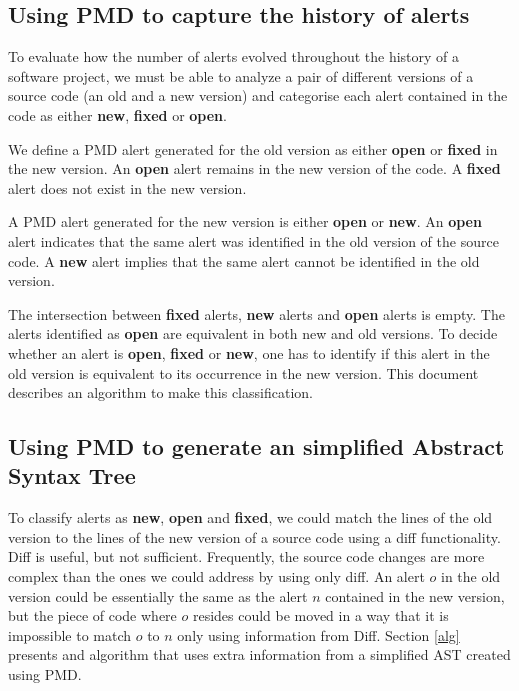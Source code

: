 \documentclass[
]{article}
\begin{document}
\normalsize

\subsection{Using PMD to capture the history of alerts}\label{history}

To evaluate how the number of alerts evolved throughout the history of a
software project, we must be able to analyze a pair of different
versions of a source code (an old and a new version) and categorise each
alert contained in the code as either \textbf{new}, \textbf{fixed} or
\textbf{open}.

We define a PMD alert generated for the old version as either
\textbf{open} or \textbf{fixed} in the new version. An \textbf{open}
alert remains in the new version of the code. A \textbf{fixed} alert
does not exist in the new version.

A PMD alert generated for the new version is either \textbf{open} or
\textbf{new}. An \textbf{open} alert indicates that the same alert was
identified in the old version of the source code. A \textbf{new} alert
implies that the same alert cannot be identified in the old version.

The intersection between \textbf{fixed} alerts, \textbf{new} alerts and
\textbf{open} alerts is empty. The alerts identified as \textbf{open}
are equivalent in both new and old versions. To decide whether an alert
is \textbf{open}, \textbf{fixed} or \textbf{new}, one has to identify if
this alert in the old version is equivalent to its occurrence in the new
version. This document describes an algorithm to make this
classification.

\subsection{Using PMD to generate an simplified Abstract Syntax Tree }\label{ast}

To classify alerts as \textbf{new}, \textbf{open} and \textbf{fixed}, we
could match the lines of the old version to the lines of the new version
of a source code using a diff functionality. Diff is useful, but not
sufficient. Frequently, the source code changes are more complex than
the ones we could address by using only diff. An alert \(o\) in the old
version could be essentially the same as the alert \(n\) contained in
the new version, but the piece of code where \(o\) resides could be
moved in a way that it is impossible to match \(o\) to \(n\) only using
information from Diff. Section \ref{alg} presents and algorithm that
uses extra information from a simplified AST created using PMD.
\end{document}
